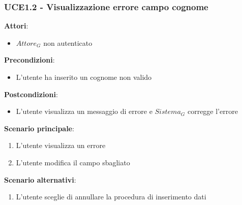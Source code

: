 \subsubsection{UCE1.2 - Visualizzazione errore campo cognome}
\textbf{Attori}:
\begin{itemize}
    \item $\textit{Attore}_G$ non autenticato
\end{itemize}
\textbf{Precondizioni}:
\begin{itemize}
    \item L'utente ha inserito un cognome non valido
\end{itemize}
\textbf{Postcondizioni}:
\begin{itemize}
    \item L'utente visualizza un messaggio di errore e $\textit{Sistema}_G$ corregge l'errore
\end{itemize}
\textbf{Scenario principale}:
\begin{enumerate}
    \item L'utente visualizza un errore 
    \item L'utente modifica il campo sbagliato
\end{enumerate}
\textbf{Scenario alternativi}:
\begin{enumerate}
    \item L'utente sceglie di annullare la procedura di inserimento dati
\end{enumerate}